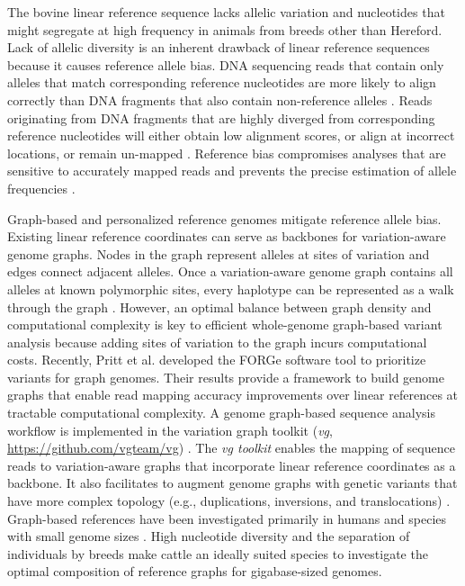 \documentclass[../main.tex]{subfiles}
\begin{document}
The bovine linear reference sequence lacks allelic variation and nucleotides that might segregate at high frequency in animals from breeds other than Hereford. Lack of allelic diversity is an inherent drawback of linear reference sequences because it causes reference allele bias. DNA sequencing reads that contain only alleles that match corresponding reference nucleotides are more likely to align correctly than DNA fragments that also contain non-reference alleles \citep{van2015wasp,paten2017genome}. Reads originating from DNA fragments that are highly diverged from corresponding reference nucleotides will either obtain low alignment scores, or align at incorrect locations, or remain un-mapped \citep{pritt2018forge}. Reference bias compromises analyses that are sensitive to accurately mapped reads and prevents the precise estimation of allele frequencies \citep{van2015wasp,gunther2019presence,salavati2019elimination,degner2009effect}.

Graph-based \citep{garrison2018variation,paten2017genome} and personalized reference genomes \citep{ballouz2019time,groza2020personalized} mitigate reference allele bias. Existing linear reference coordinates can serve as backbones for variation-aware genome graphs. Nodes in the graph represent alleles at sites of variation and edges connect adjacent alleles. Once a variation-aware genome graph contains all alleles at known polymorphic sites, every haplotype can be represented as a walk through the graph \citep{siren2020haplotype}. However, an optimal balance between graph density and computational complexity is key to efficient whole-genome graph-based variant analysis because adding sites of variation to the graph incurs computational costs. Recently, Pritt et al. \citep{pritt2018forge} developed the FORGe software tool to prioritize variants for graph genomes. Their results provide a framework to build genome graphs that enable read mapping accuracy improvements over linear references at tractable computational complexity. A genome graph-based sequence analysis workflow is implemented in the variation graph toolkit (\emph{vg}, \url{https://github.com/vgteam/vg}) \citep{garrison2018variation}. The \emph{vg toolkit} enables the mapping of sequence reads to variation-aware graphs that incorporate linear reference coordinates as a backbone. It also facilitates to augment genome graphs with genetic variants that have more complex topology (e.g., duplications, inversions, and translocations) \citep{hickey2020genotyping}. Graph-based references have been investigated primarily in humans and species with small genome sizes \citep{paten2017genome}. High nucleotide diversity and the separation of individuals by breeds make cattle an ideally suited species to investigate the optimal composition of reference graphs for gigabase-sized genomes.
\end{document}
